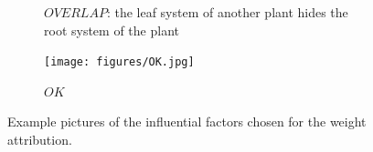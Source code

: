 \begin{figure}
\begin{subfigure}[t]{.13\textwidth}
  \caption{$OVERLAP$: the leaf system of another plant hides the root system of the plant}
  \label{fig:OVERLAP}
\end{subfigure}
%
\begin{subfigure}[t]{.13\textwidth}
  \centering
  \texttt{[image: figures/OK.jpg]}
  \caption{$OK$%
  			}
  \label{fig:OK}
\end{subfigure}
%
\caption{Example pictures of the influential factors chosen for the weight attribution.}
\label{fig:example_influential_factors}
\end{figure}
%


